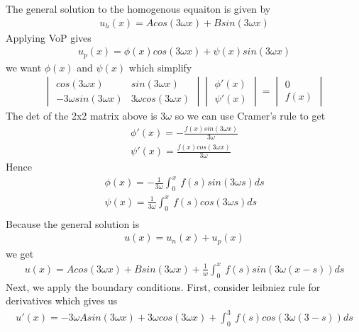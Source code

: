 \documentclass[11pt]{SelfArxOneColBMN}
\begin{document}
\begin{solution}
  The general solution to the homogenous equaiton is given by
  \begin{eqnarray*}
    u_h(x) = Acos(3\omega x) + Bsin(3\omega x)
  \end{eqnarray*}
  Applying VoP gives
  \begin{eqnarray*}
    u_p(x) = \phi(x)cos(3\omega x) + \psi(x)sin(3\omega x)
  \end{eqnarray*}
  we want $\phi(x)$ and $\psi(x)$ which simplify
  \begin{eqnarray*}
    \begin{vmatrix}
      cos(3\omega x) & sin(3\omega x)\\
      -3\omega sin(3\omega x) & 3\omega cos(3\omega x)
    \end{vmatrix}
    \begin{vmatrix}
      \phi'(x)\\
      \psi'(x)
    \end{vmatrix}
    =
    \begin{vmatrix}
      0\\
      f(x)
    \end{vmatrix}
  \end{eqnarray*}
  The det of the 2x2 matrix above is $3\omega$ so we can use Cramer's rule to get
  \begin{eqnarray*}
    \phi'(x) = -\frac{f(x)sin(3\omega x)}{3\omega}\\
    \psi'(x) = \frac{f(x)cos(3\omega x)}{3\omega}
  \end{eqnarray*}
  Hence
  \begin{eqnarray*}
    \phi(x) = -\frac{1}{3\omega}\int_0^x\: f(s)sin(3\omega s)ds\\
    \psi(x) = \frac{1}{3\omega}\int_0^x\: f(s)cos(3\omega s)ds\\
  \end{eqnarray*}
  Because the general solution is
  \begin{eqnarray*}
    u(x) = u_n(x) + u_p(x)
  \end{eqnarray*}
  we get
  \begin{eqnarray*}
    u(x) = Acos(3\omega x) + Bsin(3\omega x) + \frac{1}{w}\int_0^x\: f(s)sin(3\omega(x - s))ds
  \end{eqnarray*}
  Next, we apply the boundary conditions. First, consider leibniez rule for derivatives which gives us
  \begin{eqnarray*}
    u'(x) = -3\omega Asin(3\omega x) + 3\omega cos(3\omega x) + \int_0^3\: f(s)cos(3\omega(3 - s))ds

\end{eqnarray*}
\end{solution}
\end{document}
